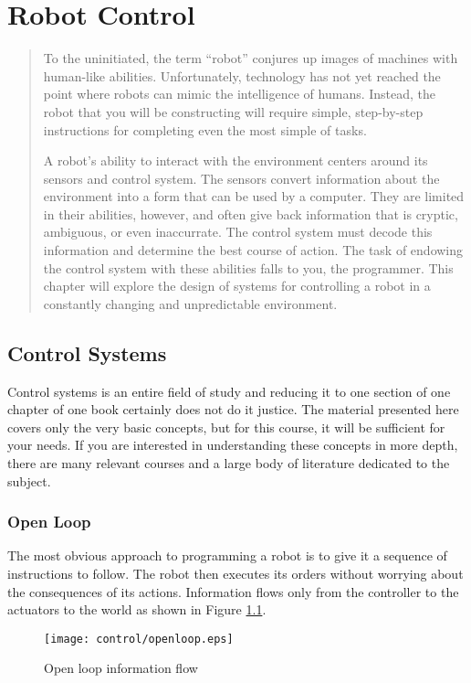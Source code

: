 \chapter{Robot Control}
\begin{quote}
To the uninitiated, the term ``robot'' conjures up images of machines
with human-like abilities. Unfortunately, technology has not yet
reached the point where robots can mimic the intelligence of
humans. Instead, the robot that you will be constructing will require
simple, step-by-step instructions for completing even the most simple
of tasks.

A robot's ability to interact with the environment centers around its
sensors and control system. The sensors convert information about the
environment into a form that can be used by a computer. They are
limited in their abilities, however, and often give back information
that is cryptic, ambiguous, or even inaccurrate. The control system
must decode this information and determine the best course of
action. The task of endowing the control system with these abilities
falls to you, the programmer. This chapter will explore the design of
systems for controlling a robot in a constantly changing and
unpredictable environment.
\end{quote}

\section{Control Systems}
Control systems is an entire field of study and reducing it to one
section of one chapter of one book certainly does not do it justice.
The material presented here covers only the very basic concepts, but
for this course, it will be sufficient for your needs.  If you are
interested in understanding these concepts in more depth, there are
many relevant courses and a large body of literature dedicated to the
subject.

\subsection{Open Loop}

The most obvious approach to programming a robot is to give it a
sequence of instructions to follow. The robot then executes its orders
without worrying about the consequences of its actions. Information
flows only from the controller to the actuators to the world as shown
in Figure \ref{openloop}.

\begin{figure}[htbp]
\begin{center}
\texttt{[image: control/openloop.eps]}
 \caption{Open loop information flow}
 \label{openloop}
\end{center}
\end{figure}

